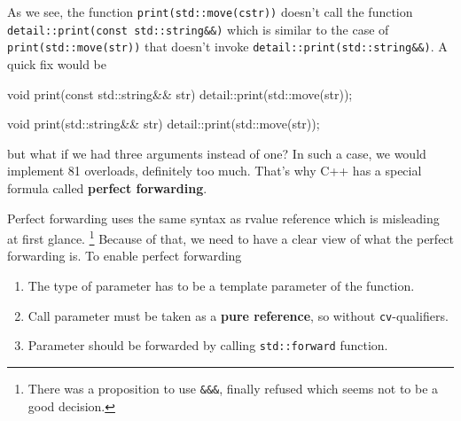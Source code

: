 \documentclass[../main]{subfiles}
\begin{document}
    As we see, the function \texttt{print(std::move(cstr))} doesn't
call the function\newline
\texttt{detail::print(const std::string\&\&)} which is similar
to the case of\linebreak
\texttt{print(std::move(str))} that doesn't invoke \texttt{detail::print(std::string\&\&)}. A quick fix would be
\begin{Code}
    void print(const std::string&& str)
    {
        detail::print(std::move(str));
    }
    
    void print(std::string&& str)
    {
        detail::print(std::move(str));
    }
\end{Code}
but what if we had three arguments instead of one? In such a case, we would implement 81 overloads, definitely too much. That's why C++ has
a special formula called \textbf{perfect forwarding}.\newline

    Perfect forwarding uses the same syntax as rvalue reference which is misleading at first glance.
\footnote{There was a proposition to use \texttt{\&\&\&},
finally refused which seems not to be a good decision.} Because of that, we need to have a clear view of what the perfect forwarding is. To enable perfect forwarding
\begin{enumerate}
    \item The type of parameter has to be a template parameter of the function.
    \item Call parameter must be taken as a \textbf{pure reference}, so without \texttt{cv}-qualifiers.
    \item Parameter should be forwarded by calling \texttt{std::forward} function.
\end{enumerate}
\end{document}

